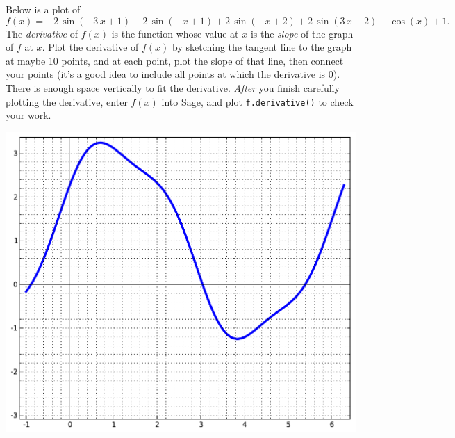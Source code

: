Below is a plot of $$f(x)=-2 \, \sin\left(-3 \, x + 1\right) - 2 \, \sin\left(-x + 1\right) + 2 \, \sin\left(-x + 2\right) + 2 \, \sin\left(3 \, x + 2\right) + \cos\left(x\right) + 1.$$  The {\em \color{red}derivative} of $f(x)$ is the function whose value at $x$ is the {\em slope} of the graph of $f$ at $x$.  Plot the derivative of $f(x)$ by sketching the tangent line to the graph at maybe 10 points, and at each point, plot the slope of that line, then connect your points (it's a good idea to include all points at which the derivative is 0).  There is enough space vertically to fit the derivative.  {\em After} you finish carefully plotting the derivative, enter $f(x)$ into Sage, and plot {\color{blue}\verb|f.derivative()|} to check your work.
\begin{center}\includegraphics{functions/2.pdf}\end{center}\newpage

